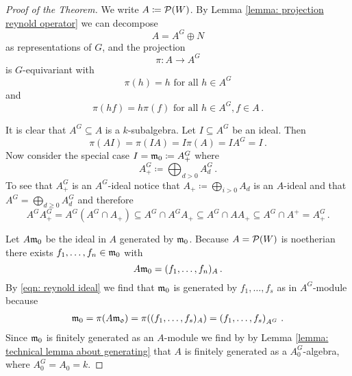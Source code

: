 \begin{proof}[Proof of the Theorem]
  We write $A \coloneqq \mathcal{P}(W)$. By Lemma \ref{lemma: projection reynold operator} we can decompose
  \[
      A
    = A^G \oplus N
  \]
  as representations of $G$, and the projection
  \[
            \pi
    \colon  A
    \to     A^G
  \]
  is $G$-equivariant with
  \[
     \pi(h)
    = h
    \text{ for all }
    h \in A^G
  \]
  and
  \[
      \pi(hf)
    = h\pi(f)
    \text{ for all }
    h \in A^G,
    f \in A \,.
  \]
  
  It is clear that $A^G \subseteq A$ is a $k$-subalgebra.
  Let $I \subseteq A^G$ be an ideal. Then
  \begin{equation}\label{eqn: reynold ideal}
      \pi(A I)
    = \pi(I A)
    = I \pi(A)
    = I A^G
    = I \,.
  \end{equation}
  Now consider the special case $I = \mathfrak{m}_0 \coloneqq A^G_+$ where
  \[
              A^G_+
    \coloneqq \bigoplus_{d > 0} A^G_d \,.
  \]
  To see that $A^G_+$ is an $A^G$-ideal notice that $A_+ \coloneqq \bigoplus_{i > 0} A_d$ is an $A$-ideal and that $A^G = \bigoplus_{d \geq 0} A^G_d$ and therefore
  \[
              A^G A^G_+
    =         A^G \left( A^G \cap A_+ \right)
    \subseteq A^G \cap A^G A_+
    \subseteq A^G \cap A A_+
    \subseteq A^G \cap A^+
    =         A^G_+ \,.
  \]
  
  Let $A \mathfrak{m}_0$ be the ideal in $A$ generated by $\mathfrak{m}_0$.
  Because $A = \mathcal{P}(W)$ is noetherian there exists $f_1, \dotsc, f_n \in \mathfrak{m}_0$ with
  \[
      A \mathfrak{m}_0
    = (f_1, \dotsc, f_n)_A \,.
  \]
  By \eqref{eqn: reynold ideal} we find that $\mathfrak{m}_0$ is generated by $f_1, \dotsc, f_s$ as in $A^G$-module because
  \begin{align*}
      \mathfrak{m}_0
    = \pi(A \mathfrak{m_0})
    = \pi( (f_1, \dotsc, f_s)_A )
    = \left( f_1, \dotsc, f_s \right)_{A^G} \,.
  \end{align*}
  Since $\mathfrak{m}_0$ is finitely generated as an $A$-module we find by by Lemma \ref{lemma: technical lemma about generating} that $A$ is finitely generated as a $A_0^G$-algebra, where $A_0^G = A_0 = k$.
\end{proof}




